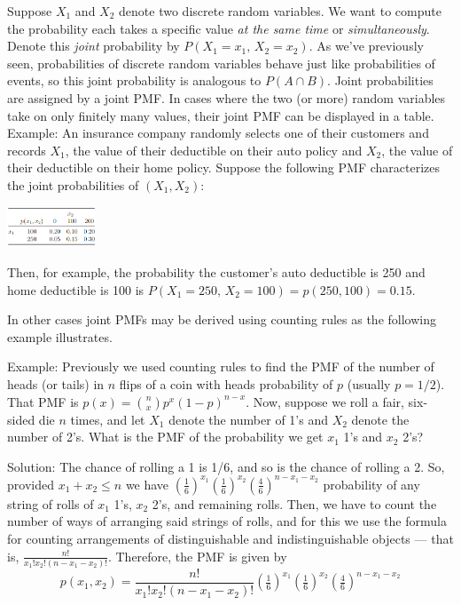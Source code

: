 \documentclass[
]{book}
\begin{document}
Suppose \(X_1\) and \(X_2\) denote two discrete random variables. We want to compute the probability each takes a specific value \emph{at the same time} or \emph{simultaneously}. Denote this \emph{joint} probability by \(P(X_1 = x_1, \, X_2 = x_2)\). As we've previously seen, probabilities of discrete random variables behave just like probabilities of events, so this joint probability is analogous to \(P(A\cap B)\). Joint probabilities are assigned by a joint PMF. In cases where the two (or more) random variables take on only finitely many values, their joint PMF can be displayed in a table.
Example: An insurance company randomly selects one of their customers and records \(X_1\), the value of their deductible on their auto policy and \(X_2\), the value of their deductible on their home policy. Suppose the following PMF characterizes the joint probabilities of \((X_1, X_2)\):

\includegraphics[width=0.2\textwidth,height=\textheight]{joint_pmf.PNG}

Then, for example, the probability the customer's auto deductible is 250 and home deductible is 100 is \(P(X_1 = 250, \, X_2 = 100) = p(250,100) = 0.15\).

In other cases joint PMFs may be derived using counting rules as the following example illustrates.

Example: Previously we used counting rules to find the PMF of the number of heads (or tails) in \(n\) flips of a coin with heads probability of \(p\) (usually \(p=1/2\)). That PMF is \(p(x) = {n \choose x}p^x (1-p)^{n-x}\). Now, suppose we roll a fair, six-sided die \(n\) times, and let \(X_1\) denote the number of 1's and \(X_2\) denote the number of 2's. What is the PMF of the probability we get \(x_1\) 1's and \(x_2\) 2's?

Solution: The chance of rolling a 1 is 1/6, and so is the chance of rolling a 2. So, provided \(x_1 + x_2 \leq n\) we have \((\tfrac16)^{x_1}(\tfrac16)^{x_2}(\tfrac46)^{n-x_1-x_2}\) probability of any string of rolls of \(x_1\) 1's, \(x_2\) 2's, and remaining rolls. Then, we have to count the number of ways of arranging said strings of rolls, and for this we use the formula for counting arrangements of distinguishable and indistinguishable objects --- that is, \(\frac{n!}{x_1! x_2! (n-x_1 -x_2)!}\). Therefore, the PMF is given by
\[p(x_1, x_2) = \frac{n!}{x_1! x_2! (n-x_1 -x_2)!}(\tfrac16)^{x_1}(\tfrac16)^{x_2}(\tfrac46)^{n-x_1-x_2}\]
\end{document}
